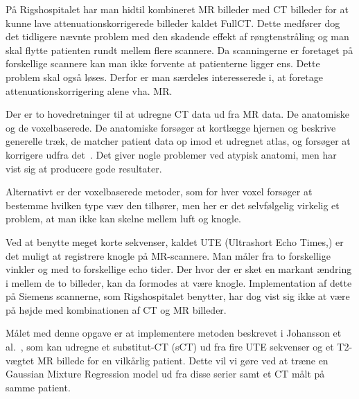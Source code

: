 På Rigshospitalet har man hidtil kombineret MR billeder med CT
billeder for at kunne lave attenuationskorrigerede billeder kaldet FullCT.
Dette medfører dog det tidligere nævnte problem med den skadende
effekt af røngtenstråling og man skal flytte patienten rundt mellem
flere scannere. Da scanningerne er foretaget på forskellige scannere
kan man ikke forvente at patienterne ligger ens. Dette problem skal
også løses. Derfor er man særdeles interesserede i, at foretage
attenuationskorrigering alene vha. MR.

Der er to hovedretninger til at udregne CT data ud fra MR data. De
anatomiske og de voxelbaserede. De anatomiske forsøger at kortlægge
hjernen og beskrive generelle træk, de matcher patient data op imod et
udregnet atlas, og forsøger at korrigere udfra det~\cite{atlas1, atlas2}. Det giver nogle
problemer ved atypisk anatomi, men har vist sig at producere gode
resultater.

Alternativt er der voxelbaserede metoder, som for hver voxel forsøger
at bestemme hvilken type væv den tilhører, men her er det selvfølgelig
virkelig et problem, at man ikke kan skelne mellem luft og knogle.

Ved at benytte meget korte sekvenser, kaldet UTE (Ultrashort Echo Times,)
er det muligt at registrere knogle på MR-scannere. Man måler fra to
forskellige vinkler og med to forskellige echo tider. Der hvor der er
sket en markant ændring i mellem de to billeder, kan da formodes at
være knogle. Implementation af dette på Siemens scannerne, som
Rigshospitalet benytter, har dog vist sig ikke at være på højde med
kombinationen af CT og MR billeder.

Målet med denne opgave er at implementere metoden beskrevet i
Johansson et al.~\cite{johansson}, som kan udregne et substitut-CT (sCT) ud fra fire
UTE sekvenser og et T2-vægtet MR billede for en vilkårlig patient. Dette
vil vi gøre ved at træne en Gaussian Mixture Regression model ud fra
disse serier samt et CT målt på samme patient.
